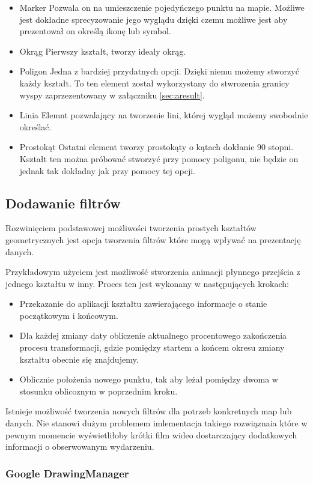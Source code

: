 \begin{itemize}
\item
Marker
Pozwala on na umieszczenie pojedyńczego punktu na mapie. Możliwe jest dokładne sprecyzowanie jego wyglądu dzięki czemu możliwe jest aby prezentował on określą ikonę lub symbol.
\item
Okrąg
Pierwszy kształt, tworzy idealy okrąg.
\item
Poligon
Jedna z bardziej przydatnych opcji. Dzięki niemu możemy stworzyć każdy kształt. To ten element został wykorzystany do stwrozenia granicy wyspy zaprzezentowany w załączniku \ref{sec:aresult}.
\item
Linia
Elemnt pozwalający na tworzenie lini, której wygląd możemy swobodnie określać.
\item
Prostokąt
Ostatni element tworzy prostokąty o kątach dokłanie 90 stopni. Kształt ten można próbować stworzyć przy pomocy poligonu, nie będzie on jednak tak dokładny jak przy pomocy tej opcji.

\end{itemize}

\subsection{Dodawanie filtrów}
\label{subsec:filters}

Rozwinięciem podstawowej możliwości tworzenia prostych kształtów geometrycznych jest opcja tworzenia filtrów które mogą wpływać na prezentację danych.

Przykładowym użyciem jest możliwość stworzenia animacji płynnego przejścia z jednego kształtu w inny. Proces ten jest wykonany w następujących krokach:

\begin{itemize}
\item
Przekazanie do aplikacji kształtu zawierającego informacje o stanie początkowym i końcowym.
\item
Dla każdej zmiany daty obliczenie aktualnego procentowego zakończenia procesu transformacji, gdzie pomiędzy startem a końcem okresu zmiany kształtu obecnie się znajdujemy.
\item
Oblicznie położenia nowego punktu, tak aby leżał pomiędzy dwoma w stosunku oblicoznym w poprzednim kroku.
\end{itemize}

Istnieje możliwość tworzenia nowych filtrów dla potrzeb konkretnych map lub danych. Nie stanowi dużym problemem imlementacja takiego rozwiąznaia które w pewnym momencie wyświetliłoby krótki film wideo dostarczający dodatkowych informacji o obserwowanym wydarzeniu.

\subsubsection{Google DrawingManager}
\label{subsubsec:svg}
